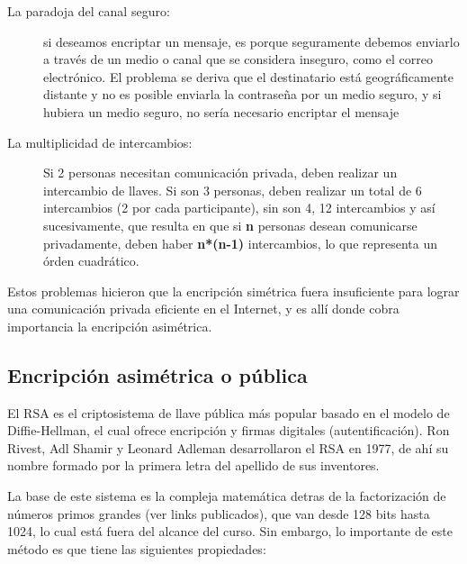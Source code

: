 \begin{description}
\item[La paradoja del canal seguro: ] si deseamos encriptar un
  mensaje, es porque seguramente debemos enviarlo a través de un medio
  o canal que se considera inseguro, como el correo electrónico.  El
  problema se deriva que el destinatario está geográficamente distante
  y no es posible enviarla la contraseña por un medio seguro, y si
  hubiera un medio seguro, no sería necesario encriptar el mensaje
\item[La multiplicidad de intercambios: ] Si 2 personas necesitan
  comunicación privada, deben realizar un intercambio de llaves.  Si
  son 3 personas, deben realizar un total de 6 intercambios (2 por
  cada participante), sin son 4, 12 intercambios y así sucesivamente,
  que resulta en que si \textbf{n} personas desean comunicarse
  privadamente, deben haber \textbf{n*(n-1)} intercambios, lo que
  representa un órden cuadrático.
\end{description}

Estos problemas hicieron que la encripción simétrica fuera
insuficiente para lograr una comunicación privada eficiente en el
Internet, y es allí donde cobra importancia la encripción asimétrica.

\subsection{Encripción asimétrica o pública}
\label{sec:encr-asim-o}

El RSA es el criptosistema de llave pública más popular basado en el
modelo de Diffie-Hellman, el cual ofrece encripción y firmas digitales
(autentificación). Ron Rivest, Adl Shamir y Leonard Adleman
desarrollaron el RSA en 1977, de ahí su nombre formado por la primera
letra del apellido de sus inventores.

La base de este sistema es la compleja matemática detras de la
factorización de números primos grandes (ver links publicados), que
van desde 128 bits hasta 1024, lo cual está fuera del alcance del
curso.  Sin embargo, lo importante de este método es que tiene las
siguientes propiedades:

